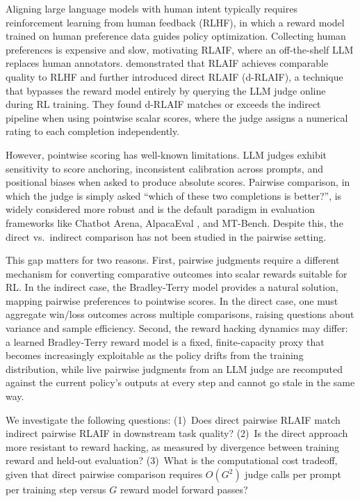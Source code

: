 \documentclass{article}
\begin{document}
Aligning large language models with human intent typically requires reinforcement learning from human feedback (RLHF), in which a reward model trained on human preference data guides policy optimization. Collecting human preferences is expensive and slow, motivating RLAIF, where an off-the-shelf LLM replaces human annotators. \citet{lee2024rlaif} demonstrated that RLAIF achieves comparable quality to RLHF and further introduced direct RLAIF (d-RLAIF), a technique that bypasses the reward model entirely by querying the LLM judge online during RL training. They found d-RLAIF matches or exceeds the indirect pipeline when using pointwise scalar scores, where the judge assigns a numerical rating to each completion independently.

However, pointwise scoring has well-known limitations. LLM judges exhibit sensitivity to score anchoring, inconsistent calibration across prompts, and positional biases when asked to produce absolute scores. Pairwise comparison, in which the judge is simply asked ``which of these two completions is better?'', is widely considered more robust and is the default paradigm in evaluation frameworks like Chatbot Arena, AlpacaEval \citep{dubois2024alpacaeval}, and MT-Bench. Despite this, the direct vs.\ indirect comparison has not been studied in the pairwise setting.

This gap matters for two reasons. First, pairwise judgments require a different mechanism for converting comparative outcomes into scalar rewards suitable for RL. In the indirect case, the Bradley-Terry model provides a natural solution, mapping pairwise preferences to pointwise scores. In the direct case, one must aggregate win/loss outcomes across multiple comparisons, raising questions about variance and sample efficiency. Second, the reward hacking dynamics may differ: a learned Bradley-Terry reward model is a fixed, finite-capacity proxy that becomes increasingly exploitable as the policy drifts from the training distribution, while live pairwise judgments from an LLM judge are recomputed against the current policy's outputs at every step and cannot go stale in the same way.

We investigate the following questions: (1)~Does direct pairwise RLAIF match indirect pairwise RLAIF in downstream task quality? (2)~Is the direct approach more resistant to reward hacking, as measured by divergence between training reward and held-out evaluation? (3)~What is the computational cost tradeoff, given that direct pairwise comparison requires $O(G^2)$ judge calls per prompt per training step versus $G$ reward model forward passes?
\end{document}
